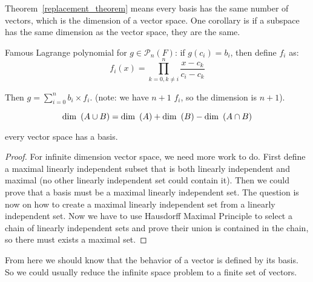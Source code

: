 Theorem~\ref{replacement_theorem} means every basis has the same number of vectors, which is the dimension of a vector space. One corollary is if a subspace has the same dimension as the vector space, they are the same.


\begin{example}
   Famous Lagrange polynomial for $g \in \mathcal{P}_n (F)$: if $g(c_i) = b_i$, then define $f_i$ as:
\begin{equation}
    f_i(x) = \prod_{k=0,k \neq i}^{n} \frac{x - c_k}{c_i - c_k}
\end{equation}

Then $g = \sum_{i=0}^{n} b_i \times f_i $. (note: we have $n+1$ $f_i$, so the dimension is $n+1$). 
\end{example}

\begin{theorem}
    \begin{equation}
        \displaystyle \mathrm{dim}~\left( A\cup B \right) = \displaystyle \mathrm{dim}~\left( A \right) + \displaystyle \mathrm{dim}~\left( B \right) - \displaystyle \mathrm{dim}~\left( A \cap B \right)
    \end{equation}    
\end{theorem}



\begin{theorem}
    every vector space has a basis.
\end{theorem}
\begin{proof}
    For infinite dimension vector space, we need more work to do. First define a maximal linearly independent subset that is both linearly independent and maximal (no other linearly independent set could contain it). Then we could prove that a basis must be a maximal linearly independent set. The question is now on how to create a maximal linearly independent set from a linearly independent set. Now we have to use Hausdorff Maximal Principle to select a chain of linearly independent sets and prove their union is contained in the chain, so there must exists a maximal set.
\end{proof}


From here we should know that the behavior of a vector is defined by its basis. So we could usually reduce the infinite space problem to a finite set of vectors.

















